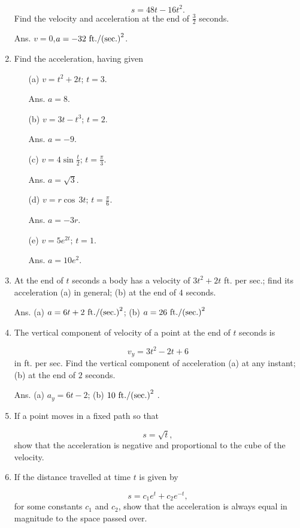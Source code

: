 \begin{enumerate}
\[
 s = 48t - 16t^2.
\]
Find the velocity and acceleration at the end of 
$\frac{3}{2}$ seconds.

Ans. $v = 0$,$a = - 32\ \fps2$.

\item
 Find the acceleration, having given

\begin{itemize}
\item[(a)] 
$v = t^2 + 2t$; $t = 3$. 	

Ans. 	$a = 8$.

\item[(b)] $v = 3t- t^3$; $t = 2$. 

Ans. $a = - 9$.

\item[(c)] $v = 4 \sin \frac{t}{2}$; $t = \frac{\pi}{3}$. 

Ans. $a = \sqrt{3}$.

\item[(d)] $v = r \cos\, 3t$; $t = \frac{\pi}{6}$.

Ans. $a = - 3r$.

\item[(e)] $v = 5e^{2t}$; $t = 1$. 

Ans. $a = 10e^2$.
\end{itemize}

\item
At the end of $t$ seconds a body has a velocity of 
$3t^2 + 2t$ ft. per sec.; find its acceleration (a) in general; 
(b) at the end of $4$ seconds.

Ans. (a) $a = 6t + 2\ \fps2$; (b) 
$a = 26\ \fps2$
\item
The vertical component of velocity of a point at the end of 
$t$ seconds is

\[
 v_y = 3t^2 - 2t + 6 
\]
in ft. per sec.
Find the vertical component of acceleration (a) at any instant; 
(b) at the end of $2$ seconds.

Ans. (a) $a_y = 6t - 2$; (b) $10\ \fps2$ .

\item
 If a point moves in a fixed path so that

\[
 s = \sqrt{t},
\]
show that the acceleration is negative and proportional to the 
cube of the velocity.

\item
 If the distance travelled at time $t$ is given by

\[
s = c_1e^t + c_2e^{-t},
\]
for some constants $c_1$ and $c_2$,
show that the acceleration is always equal in magnitude to the space 
passed over.


\end{enumerate}
